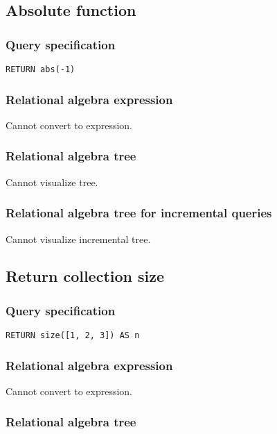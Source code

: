 \subsection{Absolute function}

\subsubsection*{Query specification}

\begin{lstlisting}
RETURN abs(-1)
\end{lstlisting}

\subsubsection*{Relational algebra expression}

Cannot convert to expression.

\subsubsection*{Relational algebra tree}

Cannot visualize tree.

\subsubsection*{Relational algebra tree for incremental queries}

Cannot visualize incremental tree.

\subsection{Return collection size}

\subsubsection*{Query specification}

\begin{lstlisting}
RETURN size([1, 2, 3]) AS n
\end{lstlisting}

\subsubsection*{Relational algebra expression}

Cannot convert to expression.

\subsubsection*{Relational algebra tree}


